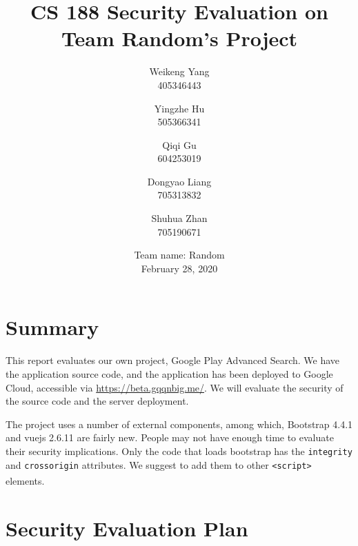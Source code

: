 \documentclass[12pt, a4paper]{article}
\title{CS 188 Security Evaluation on Team Random's Project}
\author{Weikeng Yang\\405346443 \and
Yingzhe Hu\\505366341 \and
Qiqi Gu\\604253019 \and
Dongyao Liang\\705313832 \and
Shuhua Zhan\\705190671}
\date{Team name: Random\\[2mm]February 28, 2020}
\newcommand{\code}[1]{\texttt{#1}}
\begin{document}
\maketitle

\tableofcontents
\newpage
\section{Summary}
This report evaluates our own project, Google Play Advanced Search. We have the application source code, and the application has been deployed to Google Cloud, accessible via \url{https://beta.gqqnbig.me/}. We will evaluate the security of the source code and the server deployment.



The project uses a number of external components, among which, Bootstrap 4.4.1 and vuejs 2.6.11 are fairly new. People may not have enough time to evaluate their security implications. Only the code that loads bootstrap has the \code{integrity} and \code{crossorigin} attributes. We suggest to add them to other \code{<script>} elements.\textsuperscript{\cite{html-standard-script}}




\section{Security Evaluation Plan}

\end{document}

